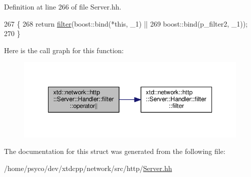 Definition at line 266 of file Server.\+hh.


\begin{DoxyCode}
267       \{
268         \textcolor{keywordflow}{return} \hyperlink{structxtd_1_1network_1_1http_1_1Server_1_1Handler_1_1filter_aade4e97fe12a8e43c647ac1ca7cc21c7}{filter}(boost::bind(*\textcolor{keyword}{this},     \_1) ||
269                       boost::bind(p\_filter2, \_1));
270       \}
\end{DoxyCode}


Here is the call graph for this function\+:
\nopagebreak
\begin{figure}[H]
\begin{center}
\leavevmode
\includegraphics[width=348pt]{structxtd_1_1network_1_1http_1_1Server_1_1Handler_1_1filter_a552b18f4f6e535a016d547ce0efc53c8_cgraph}
\end{center}
\end{figure}




The documentation for this struct was generated from the following file\+:\begin{DoxyCompactItemize}
\item 
/home/psyco/dev/xtdcpp/network/src/http/\hyperlink{http_2Server_8hh}{Server.\+hh}\end{DoxyCompactItemize}
